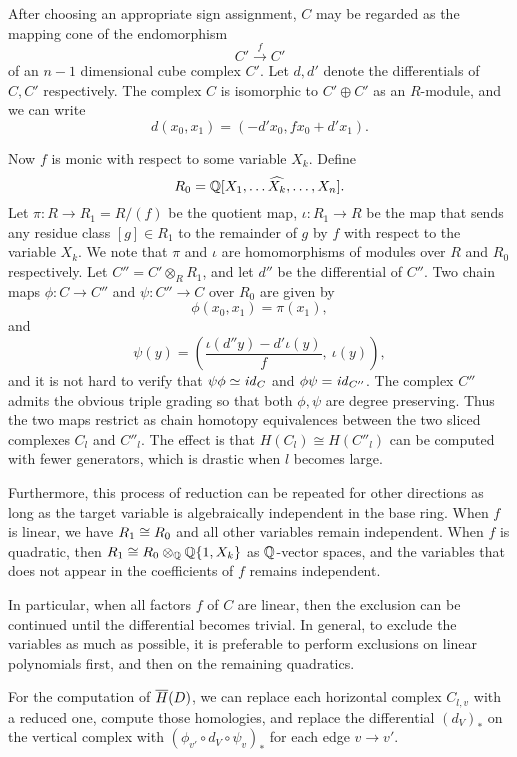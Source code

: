 After choosing an appropriate sign assignment, $C$ may be regarded as the mapping cone of the endomorphism 
\[
    C' \xrightarrow{f} C'
\]
of an $n-1$ dimensional cube complex $C'$. Let $d, d'$ denote the differentials of $C, C'$ respectively. The complex $C$ is isomorphic to $C' \oplus C'$ as an $R$-module, and we can write
\[
    d(x_0, x_1) = (-d'x_0, fx_0 + d'x_1).
\]

Now $f$ is monic with respect to some variable $X_k$. Define
\[
R_0 = \mathbb{Q}[X_1, \ldots \widehat{X_k}, \ldots, X_n].
\]
Let $\pi \colon R \rightarrow R_1 = R/(f)$ be the quotient map, $\iota \colon R_1 \rightarrow R$ be the map that sends any residue class $[g] \in R_1$ to the remainder of $g$ by $f$ with respect to the variable $X_k$.
We note that $\pi$ and $\iota$ are homomorphisms of modules over $R$ and $R_0$ respectively.
Let $C'' = C' \otimes_R R_1$, and let $d''$ be the differential of $C''$. Two chain maps $\phi \colon C \rightarrow C''$ and $\psi \colon C'' \rightarrow C$ over $R_0$ are given by
\[
    \phi(x_0, x_1) = \pi(x_1),
\]
and
\[
    \psi(y) = \left(\frac{\iota(d''y) - d'\iota(y)}{f},\  \iota(y)\right),
\]
and it is not hard to verify that $\psi \phi \simeq \mathit{id}_C$ and $\phi \psi = \mathit{id}_{C''}$.
The complex $C''$ admits the obvious triple grading so that both $\phi, \psi$ are degree preserving. Thus the two maps restrict as chain homotopy equivalences between the two sliced complexes $C_l$ and $C''_l$. The effect is that $H(C_l) \cong H(C''_l)$ can be computed with fewer generators, which is drastic when $l$ becomes large. 

Furthermore, this process of reduction can be repeated for other directions as long as the target variable is algebraically independent in the base ring. When $f$ is linear, we have $R_1 \cong R_0$ and all other variables remain independent. When $f$ is quadratic, then $R_1 \cong R_0 \otimes_{\mathbb{Q}} \mathbb{Q}\{1, X_k\}$ as $\mathbb{Q}$-vector spaces, and the variables that does not appear in the coefficients of $f$ remains independent.

In particular, when all factors $f$ of $C$ are linear, then the exclusion can be continued until the differential becomes trivial. In general, to exclude the variables as much as possible, it is preferable to perform exclusions on linear polynomials first, and then on the remaining quadratics. 

For the computation of $\overline{H}(D)$, we can replace each horizontal complex $C_{l, v}$ with a reduced one, compute those homologies, and replace the differential $(d_V)_*$ on the vertical complex with $(\phi_{v'} \circ d_V \circ \psi_v)_*$ for each edge $v \rightarrow v'$. 

